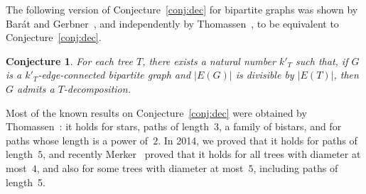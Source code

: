 \documentclass[12pt,reqno,a4paper]{amsart}
\newtheorem{theorem}{Theorem}[section]
\newtheorem{conjecture}[theorem]{Conjecture}
\begin{document}

The following version of Conjecture~\ref{conj:dec} for
bipartite graphs was shown by Barát and Gerbner~\cite{BaGe14}, and independently by
Thomassen~\cite{Th13a}, to be equivalent to Conjecture~\ref{conj:dec}.

\begin{conjecture}\label{conj:dec-bip}
  For each tree $T$, there exists a natural number $k'_T$ such that,
  if $G$ is a $k'_T$-edge-connected bipartite graph and $|E(G)|$ is
  divisible by $|E(T)|$, then \(G\) admits a \(T\)-decomposition.
\end{conjecture}

  Most of the known results on Conjecture~\ref{conj:dec} were
  obtained by Thomassen~\cite{Th12,Th08b,Th08a,Th13a,Th13b}: it holds
  for stars, paths of length~\(3\), a family of bistars, and for paths whose length is a power of~$2$.
  In 2014, we \cite{BoMoOsWa15-LAGOS} proved that it holds for paths of
    length~\(5\), and recently Merker~\cite{Me15+} proved that it holds for all trees
    with diameter at most~$4$, and also for some trees with diameter
    at most~$5$, including paths of length~5.
\end{document}
